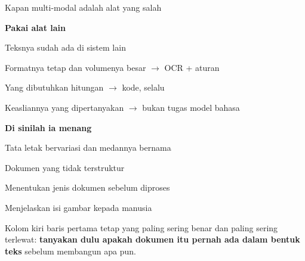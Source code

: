 \documentclass[aspectratio=169,11pt,t]{beamer}
\begin{document}
\begin{frame}[shrink=25]{Kapan multi-modal adalah alat yang salah}
\begin{minipage}[t]{0.485\textwidth}
{\fontsize{9.4}{12.6}\selectfont\color{fg2}\textbf{Pakai alat lain}\par}\vskip 4pt
\begin{ibullets}
\item Teksnya sudah ada di sistem lain
\item Formatnya tetap dan volumenya besar $\rightarrow$ OCR + aturan
\item Yang dibutuhkan hitungan $\rightarrow$ kode, selalu
\item Keasliannya yang dipertanyakan $\rightarrow$ bukan tugas model bahasa
\end{ibullets}

\end{minipage}%
\hfill
\begin{minipage}[t]{0.485\textwidth}
{\fontsize{9.4}{12.6}\selectfont\color{fg2}\textbf{Di sinilah ia menang}\par}\vskip 4pt
\begin{ibullets}
\item Tata letak bervariasi dan medannya bernama
\item Dokumen yang tidak terstruktur
\item Menentukan jenis dokumen sebelum diproses
\item Menjelaskan isi gambar kepada manusia
\end{ibullets}

\end{minipage}%
\begin{iband}[signal]
Kolom kiri baris pertama tetap yang paling sering benar dan paling sering terlewat: \textbf{tanyakan dulu apakah dokumen itu pernah ada dalam bentuk teks} sebelum membangun apa pun.
\end{iband}
\end{frame}
\end{document}
